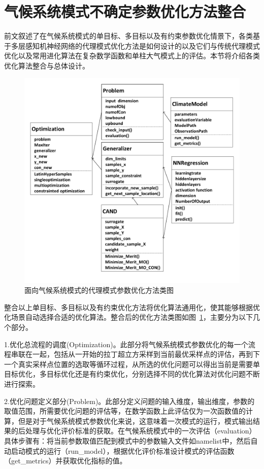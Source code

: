 \section{气候系统模式不确定参数优化方法整合}
前文叙述了在气候系统模式的单目标、多目标以及有约束参数优化情景下，各类基于多层感知机神经网络的代理模式优化方法是如何设计的以及它们与传统代理模式优化以及常用进化算法在复杂数学函数和单柱大气模式上的评估。本节将介绍各类优化算法整合与总体设计。
\begin{figure}[H] %
  \centering
  \includegraphics[scale=0.7]{figures/surrogateprocess.pdf}
  \caption{面向气候系统模式的代理模式参数优化方法类图}
  \label{fig:optclass}
\end{figure}   
整合以上单目标、多目标以及有约束优化方法将优化算法通用化，使其能够根据优化场景自动选择合适的优化算法。整合后的优化方法类图如图~\ref{fig:optclass}，主要分为以下几个部分。

1.优化总流程的调度(Optimization)。此部分将气候系统模式参数优化的每一个流程串联在一起，包括从一开始的拉丁超立方采样到当前最优采样点的评估，再到下一个真实采样点位置的选取等循环过程，从所选的优化问题可以得出当前是需要单目标优化，多目标优化还是有约束优化，分别选择不同的优化算法对优化问题不断进行探索。

2.优化问题定义部分(Problem)。此部分定义问题的输入维度，输出维度，参数的取值范围，所需要优化问题的评估等，在数学函数上此评估仅为一次函数值的计算，但是对于气候系统模式参数优化来说，这意味着一次模式的运行，模式输出结果的后处理与优化评价标准的获取。在气候系统模式中的一次评估（evaluation）具体步骤有：将当前参数取值匹配到模式中的参数输入文件如namelist中，然后自动启动模式的运行（run\_model），根据优化评价标准设计模式的评估函数（get\_metrics）并获取优化指标的值。

